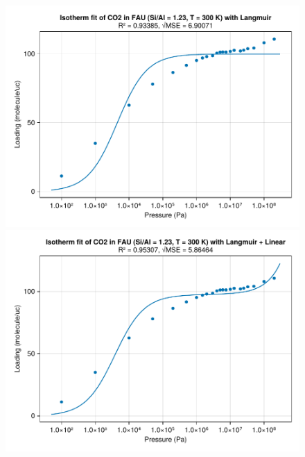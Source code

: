 \documentclass[main.tex]{subfiles}
\begin{document}
\begin{figure}
	\begin{minipage}{0.49\columnwidth}
		\includegraphics[width=\columnwidth]{figures/isotherms/Langmuir.pdf}
	\end{minipage}\hfill%
	\begin{minipage}{0.49\columnwidth}
		\includegraphics[width=\columnwidth]{figures/isotherms/Langmuir + Linear.pdf}
	\end{minipage}


\end{figure}
\end{document}
